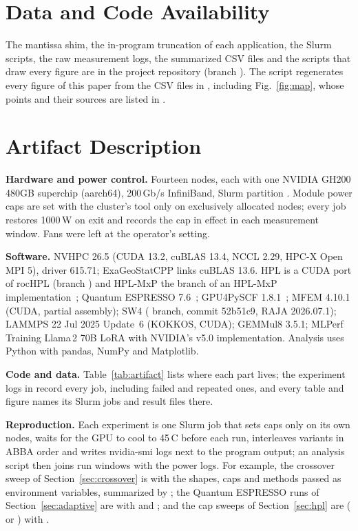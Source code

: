 \documentclass[conference]{IEEEtran}
\newcommand{\W}{\,W}
\begin{document}
\section*{Data and Code Availability}
The mantissa shim, the in-program truncation of each application, the Slurm scripts, the raw measurement logs, the
summarized CSV files and the scripts that draw every figure are in the project repository (branch
). The script  regenerates every figure of this
paper from the CSV files in , including Fig.~\ref{fig:map}, whose points and their sources are
listed in .

\appendices
\section{Artifact Description}\label{app:artifact}

\textbf{Hardware and power control.} Fourteen nodes, each with one NVIDIA GH200 480GB superchip (aarch64), 200\,Gb/s
InfiniBand, Slurm partition . Module power caps are set with the cluster's  tool only on
exclusively allocated nodes; every job restores 1000\W{} on exit and records the cap in effect in each measurement
window. Fans were left at the operator's setting.

\textbf{Software.} NVHPC 26.5 (CUDA 13.2, cuBLAS 13.4, NCCL 2.29, HPC-X Open MPI 5), driver 615.71; ExaGeoStatCPP links
cuBLAS 13.6. HPL is a CUDA port of rocHPL (branch ) and HPL-MxP the 
branch of an HPL-MxP implementation~\cite{Dongarra2025}; Quantum ESPRESSO 7.6~\cite{Giannozzi2020}; GPU4PySCF
1.8.1~\cite{Wu2025,Li2025}; MFEM 4.10.1 (CUDA, partial assembly); SW4 ( branch, commit 52b51c9, RAJA
2026.07.1); LAMMPS 22 Jul 2025 Update~6 (KOKKOS, CUDA); GEMMul8 3.5.1; MLPerf Training Llama\,2 70B LoRA with NVIDIA's
v5.0 implementation. Analysis uses Python with pandas, NumPy and Matplotlib.


\textbf{Code and data.} Table~\ref{tab:artifact} lists where each part lives; the experiment logs in
 record every job, including failed and repeated ones, and every table and figure names its Slurm jobs
and result files there.

\textbf{Reproduction.} Each experiment is one Slurm job that sets caps only on its own nodes, waits for the GPU to
cool to 45\,\textdegree C before each run, interleaves variants in ABBA order and writes nvidia-smi logs next to the
program output; an analysis script then joins run windows with the power logs. For example, the crossover sweep of
Section~\ref{sec:crossover} is  with the shapes, caps and methods passed as
environment variables, summarized by ; the Quantum ESPRESSO runs of
Section~\ref{sec:adaptive} are  with  and
; and the cap sweeps of Section~\ref{sec:hpl} are 
( or ) with .



\end{document}
